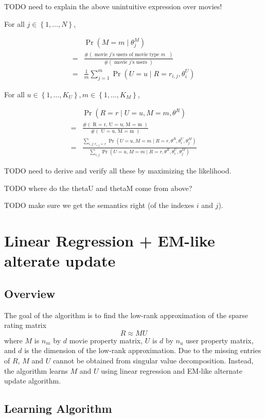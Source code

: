 \documentclass{article}
\newcommand{\PO}[1]{{ \Pr \left( #1 \right) }}
\newcommand{\PP}[2]{{ \PO{ #1 \mid #2 } }}
\newcommand{\N}[1]{{ \# \left( \textrm{ #1 } \right) }}
\newcommand{\range}[1]{{ \left\{ 1, \dots, #1 \right\} }}
\begin{document}
TODO need to explain the above unintuitive expression over movies!

For all $j \in \range{N}$,

\begin{align*}
  & \PP{ M = m }{ \theta^M_j } \\
  =& \frac{ \N{movie $j$'s users of movie type $m$} }{ \N{movie $j$'s users} } \\
  =& \frac{1}{m} \sum_{j=1}^m \PP{ U = u }{ R = r_{i,j}, \theta^U_i }
\end{align*}

For all $u \in \range{K_U}, m \in \range{K_M}$,

\begin{align*}
& \PP{ R = r }{ U = u, M = m, \theta^R } \\
=& \frac{
  \N{R = r, U = u, M = m}
}{
  \N{U = u, M = m}
} \\
=& \frac{
  \sum_{i,j: r_{i,j} = r}
  \PP{U = u, M = m}{R = r, \theta^R, \theta^U_i, \theta^M_j }
}{
  \sum_{i,j}
  \PP{U = u, M = m}{R = r, \theta^R, \theta^U_i, \theta^M_j }
}
\end{align*}

TODO need to derive and verify all these by maximizing the likelihood.

TODO where do the thetaU and thetaM come from above?

TODO make sure we get the semantics right (of the indexes $i$ and $j$).

\section{Linear Regression + EM-like alterate update}

\subsection{Overview}
The goal of the algorithm is to find the low-rank approximation of the sparse rating matrix
\begin{equation}
R \approx  MU
\end{equation}
where $M$ is $n_m$ by $d$ movie property matrix, $U$ is $d$ by $n_u$ user property matrix, and $d$ is the dimension of the low-rank approximation. Due to the missing entries of $R$, $M$ and $U$ cannot be obtained from singular value decomposition. Instead, the algorithm learns $M$ and $U$ using linear regression and EM-like alternate update algorithm.
\subsection{Learning Algorithm}
\end{document}
